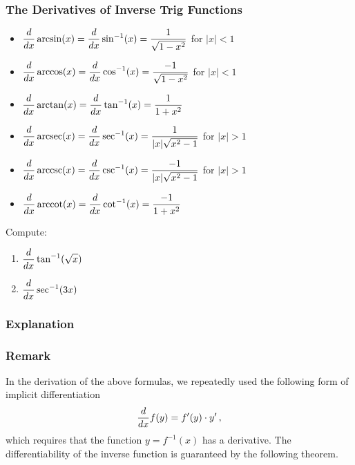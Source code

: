 \documentclass[10pt,t,presentation,ignorenonframetext,aspectratio=169]{beamer}
\title[\course]{\lecTitle}
\institute[Ohio State]
{
  \medskip
}
\date[\week]{\semester}
\author{Tae Eun Kim, Ph.D.}
\DeclareMathOperator{\arcsec}{arcsec}
\DeclareMathOperator{\arccot}{arccot}
\DeclareMathOperator{\arccsc}{arccsc}
\begin{document}
\begin{frame}
  \titlepage
\end{frame}

\begin{frame}
  \frametitle{The Derivatives of Inverse Trig Functions}
  \begin{thm}
    \hfill
    \begin{itemize}
    \item $\displaystyle \frac{d}{dx} \arcsin (x) = \frac{d}{dx} \sin^{-1}(x) = \frac{1}{\sqrt{1-x^2}}$ for $|x| < 1$
    \item $\displaystyle \frac{d}{dx} \arccos (x) = \frac{d}{dx} \cos^{-1}(x) = \frac{-1}{\sqrt{1-x^2}}$ for $|x| < 1$
    \item $\displaystyle \frac{d}{dx} \arctan (x) = \frac{d}{dx} \tan^{-1}(x) = \frac{1}{1+x^2}$
    \item $\ds \frac{d}{dx} \arcsec (x) = \frac{d}{dx} \sec^{-1}(x) = \frac{1}{|x| \sqrt{x^2-1}}$ for $|x|>1$
    \item $\ds \frac{d}{dx} \arccsc (x) = \frac{d}{dx} \csc^{-1}(x) = \frac{-1}{|x|\sqrt{x^2-1}}$ for $|x|>1$
    \item $\ds \frac{d}{dx} \arccot (x) = \frac{d}{dx} \cot^{-1}(x) = \frac{-1}{1+x^2}$
    \end{itemize}
  \end{thm}
\end{frame}

\begin{frame}
  \vs
  \question{} Compute:
  \begin{enumerate}
  \item $\displaystyle \frac{d}{\mathop{}\!d x} \tan^{-1} (\sqrt{x})$
    \vfill
  \item $\displaystyle \frac{d}{\mathop{}\!d x} \sec^{-1} (3x)$
    \vfill
  \end{enumerate}
\end{frame}

\begin{frame}
  \frametitle{Explanation}
\end{frame}

\begin{frame}
  \frametitle{Remark}
  In the derivation of the above formulas, we repeatedly used the following form of implicit differentiation
  \[
    \frac{d}{\mathop{}\!d x} f(y) = f'(y) \cdot y' \,,
  \]
  which requires that the function \(y = f^{-1}(x)\) has a derivative. The differentiability of the inverse function is guaranteed by the following theorem.
\end{frame}
\end{document}
